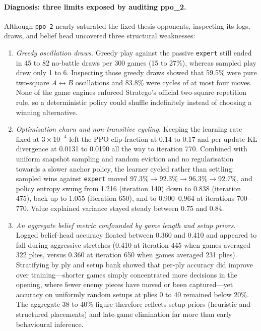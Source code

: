 \paragraph{Diagnosis: three limits exposed by auditing ppo\_2.} Although \texttt{ppo\_2} nearly
saturated the fixed thesis opponents, inspecting its logs, draws, and belief head uncovered three
structural weaknesses:
\begin{enumerate}
  \item \emph{Greedy oscillation draws.} Greedy play against the passive \texttt{expert} still
        ended in 45 to 82 no-battle draws per 300 games (15 to 27\%), whereas sampled play drew
        only 1 to 6. Inspecting those greedy draws showed that 59.5\% were pure two-square
        $A \leftrightarrow B$ oscillations and 83.8\% were cycles of at most four moves. None of
        the game engines enforced Stratego's official two-square repetition rule, so a deterministic
        policy could shuffle indefinitely instead of choosing a winning alternative.
  \item \emph{Optimisation churn and non-transitive cycling.} Keeping the learning rate fixed at
        $3 \times 10^{-4}$ left the PPO clip fraction at 0.14 to 0.17 and per-update KL divergence
        at 0.0131 to 0.0190 all the way to iteration 770. Combined with uniform snapshot sampling
        and random eviction and no regularisation towards a slower anchor policy, the learner
        cycled rather than settling: sampled wins against \texttt{expert} moved
        $97.3\% \to 92.3\% \to 96.3\% \to 92.7\%$, and policy entropy swung from 1.216 (iteration
        140) down to 0.838 (iteration 475), back up to 1.055 (iteration 650), and to 0.900--0.964
        at iterations 700--770. Value explained variance stayed steady between 0.75 and 0.84.
  \item \emph{An aggregate belief metric confounded by game length and setup priors.} Logged
        belief-head accuracy floated between 0.360 and 0.410 and appeared to fall during aggressive
        stretches (0.410 at iteration 445 when games averaged 322 plies, versus 0.360 at iteration
        650 when games averaged 231 plies). Stratifying by ply and setup bank showed that per-ply
        accuracy did improve over training---shorter games simply concentrated more decisions in
        the opening, where fewer enemy pieces have moved or been captured---yet accuracy on
        uniformly random setups at plies 0 to 40 remained below 20\%. The aggregate 38 to 40\%
        figure therefore reflects setup priors (heuristic and structured placements) and late-game
        elimination far more than early behavioural inference.
\end{enumerate}

